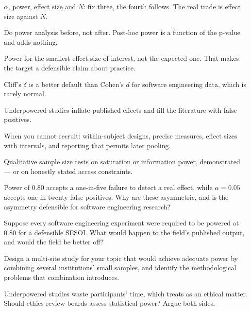 \begin{chaptersummary}
\begin{tight}
  \item $\alpha$, power, effect size and $N$: fix three, the fourth follows.
    The real trade is effect size against $N$.
  \item Do power analysis before, not after. Post-hoc power is a function of
    the p-value and adds nothing.
  \item Power for the smallest effect size of interest, not the expected one.
    That makes the target a defensible claim about practice.
  \item Cliff's $\delta$ is a better default than Cohen's $d$ for software
    engineering data, which is rarely normal.
  \item Underpowered studies inflate published effects and fill the literature
    with false positives.
  \item When you cannot recruit: within-subject designs, precise measures,
    effect sizes with intervals, and reporting that permits later pooling.
  \item Qualitative sample size rests on saturation or information power,
    demonstrated --- or on honestly stated access constraints.
\end{tight}
\end{chaptersummary}

\begin{reviewq}
  \item Power of 0.80 accepts a one-in-five failure to detect a real effect,
    while $\alpha = 0.05$ accepts one-in-twenty false positives. Why are these
    asymmetric, and is the asymmetry defensible for software engineering
    research?
  \item Suppose every software engineering experiment were required to be
    powered at 0.80 for a defensible SESOI. What would happen to the field's
    published output, and would the field be better off?
  \item Design a multi-site study for your topic that would achieve adequate
    power by combining several institutions' small samples, and identify the
    methodological problems that combination introduces.
  \item Underpowered studies waste participants' time, which 
    treats as an ethical matter. Should ethics review boards assess statistical
    power? Argue both sides.
\end{reviewq}
